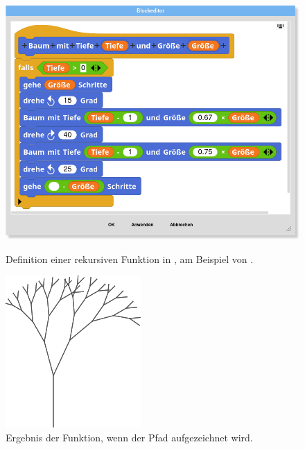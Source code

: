 \begin{figure}[!ht]
  \includegraphics[width=\linewidth]{assets/snap-edit.png}
  \caption{Definition einer rekursiven Funktion in \Snap{}, am Beispiel von \textcite{harveyBringingNo2010}.}
  \label{fig:snap-edit}
  \endminipage
  \hfill
  \begin{minipage}[t]{.41\textwidth}
  \includegraphics[width=\linewidth]{assets/snap-tree.png}
  \caption{Ergebnis der Funktion, wenn der Pfad aufgezeichnet wird.}
  \label{fig:snap-tree}
  \end{minipage}
\end{figure}

